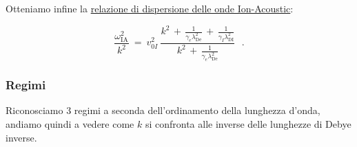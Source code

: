 Otteniamo infine la \underline{relazione di dispersione delle onde Ion-Acoustic}: 

\begin{equation} \label{ionoacustiche}
	\boxed{\frac{\omega^2_\text{IA}}{k^2}\ =\ v_{0I}^2\ \frac{k^2\,+\, \displaystyle\frac{1}{\gamma_e \lambda_\text{De}^2}\,+\,\frac{1}{\gamma_I \lambda_\text{DI}^2}}{k^2\,+\,\displaystyle\frac{1}{\gamma_e \lambda_\text{De}^2}}}\ \ \  .
\end{equation}


\subsubsection{Regimi } Riconosciamo 3 regimi a seconda dell'ordinamento della lunghezza d'onda, andiamo quindi a vedere come $k$ si confronta alle inverse delle lunghezze di Debye inverse. 

